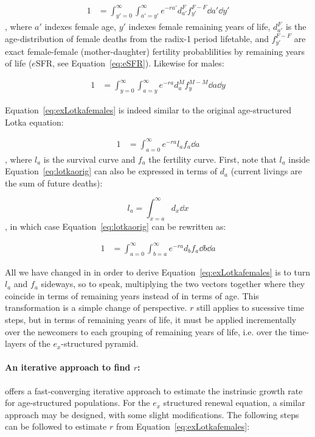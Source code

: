 \begin{align}
\label{eq:exLotkafemales}
1 &= \int _{y'=0}^\infty \int _{a'=y'}^\infty e^{-ra'} d_{a'}^F f_{y'}^{F-F} \dd
a' \dd y'
\end{align}
, where $a'$ indexes female age, $y'$ indexes female remaining years of life,
$d_{a'}^F$ is the age-distribution of female deaths from the radix-1 period
lifetable, and $f_{y'}^{F-F}$ are exact female-female (mother-daughter)
fertility probablilities by remaining years of life ($e$SFR, see Equation~\eqref{eq:eSFR}). Likewise for males:

\begin{align}
1 &= \int _{y=0}^\infty \int _{a=y}^\infty e^{-ra} d_a^M f_y^{M-M} \dd a \dd y
\end{align}

Equation~\ref{eq:exLotkafemales} is indeed similar to the
original age-structured Lotka equation:

\begin{align}
\label{eq:lotkaorig}
1 &= \int _{a=0}^\infty e^{-ra}l_a f_a \dd a
\end{align}
, where $l_a$ is the survival curve and $f_a$ the fertility curve. First, note
that $l_a$ inside Equation~\ref{eq:lotkaorig} can also be expressed in terms of
$d_a$ (current livings are the sum of future deaths):

\begin{equation}
l_a = \int _{x = a} ^\infty d_x \dd x
\end{equation}
, in which case Equation~\ref{eq:lotkaorig} can be rewritten as:

\begin{align}
\label{eq:lotkadx}
1 &= \int _{a=0}^\infty \int _{b = a}^\infty e^{-ra} d_b f_a \dd b \dd a
\end{align}

All we have changed in in order to derive Equation~\ref{eq:exLotkafemales}
is to turn $l_a$ and $f_a$ sideways, so to speak, multiplying the two vectors
together where they coincide in terms of remaining years instead of in terms of age. This
transformation is a simple change of perspective. $r$ still applies to sucessive 
time steps, but in terms of remaining years of life, it must be applied incrementally 
over the newcomers to
each grouping of remaining years of life, i.e. over the time-layers of the
$e_x$-structured pyramid.

\paragraph{An iterative approach to find $r$:}
\label{sec:exrenewalit}
\citet{coale1957new} offers a fast-converging iterative approach to estimate the
instrinsic growth rate for age-structured populations. For the $e_x$ structured
renewal equation, a similar approach may be designed, with some slight
modifications. The following steps can be followed to estimate $r$ from
Equation~\ref{eq:exLotkafemales}:

